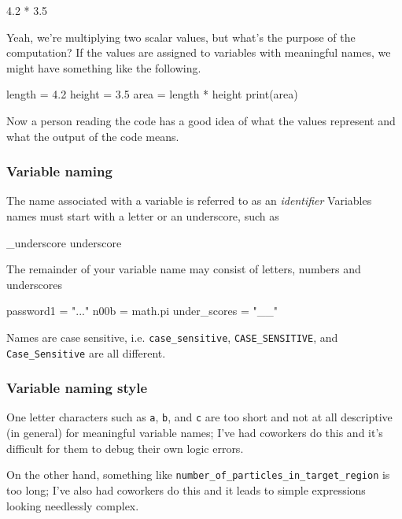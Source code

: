 \documentclass[12pt,letterpaper,twoside]{article}
\begin{document}
\begin{python}
4.2 * 3.5
\end{python}

Yeah, we're multiplying two scalar values, but what's the purpose of
the computation?
If the values are assigned to variables with meaningful names, we
might have something like the following.

\begin{python}
length = 4.2
height = 3.5
area = length * height
print(area)
\end{python}

Now a person reading the code has a good idea of what the values
represent and what the output of the code means.

\subsubsection{Variable naming}

The name associated with a variable is referred to as an
\emph{identifier}
Variables names must start with a letter or an underscore, such as

\begin{python}
_underscore
underscore
\end{python}

The remainder of your variable name may consist of letters, numbers
and underscores


\begin{python}
password1 = "..."
n00b = math.pi
under_scores = "__"
\end{python}

Names are case sensitive, i.e. \texttt{case\_sensitive},
\texttt{CASE\_SENSITIVE}, and \texttt{Case\_Sensitive} are all different.

\subsubsection{Variable naming style}

One letter characters such as \texttt{a}, \texttt{b}, and \texttt{c}
are too short and not at all descriptive (in general) for meaningful
variable names; I've had coworkers do this and it's difficult for them
to debug their own logic errors. 

On the other hand, something like
\texttt{number\_of\_particles\_in\_target\_region} is too long; I've
also had coworkers do this and it leads to simple expressions looking
needlessly complex. 
\end{document}
